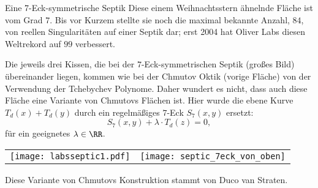 \begin{surferPage}[7-Eck]{Eine 7-Eck-symmetrische Septik}
  Diese einem Weihnachtsstern ähnelnde Fläche ist vom Grad $7$.  
    Bis vor Kurzem stellte sie noch die maximal bekannte Anzahl, $84$, von reellen
    Singularitäten auf einer Septik dar;
    erst 2004 hat Oliver Labs diesen Weltrekord auf $99$ verbessert. 

    Die jeweils drei Kissen, die bei der $7$-Eck-symmetrischen Septik (großes
    Bild) 
    übereinander liegen, kommen wie bei der 
    Chmutov Oktik (vorige Fläche) von der Verwendung der Tchebychev Polynome.
    Daher wundert es nicht, dass auch diese Fläche eine Variante von
    Chmutovs Flächen ist. 
    Hier wurde die ebene Kurve $T_d(x)+T_d(y)$
    durch ein regelmäßiges $7$-Eck $S_7(x,y)$ ersetzt:
    \[S_7(x,y) + \lambda \cdot T_d(z) = 0,\]
    für ein geeignetes $\lambda\in\RR$. 
    \vspace*{-0.3em}
    \begin{center}
      \begin{tabular}{c@{\qquad}c}
        \texttt{[image: labsseptic1.pdf]}
        &
        \texttt{[image: septic\_7eck\_von\_oben]}
      \end{tabular}
    \end{center}
    \vspace*{-0.3em}    
   Diese Variante von Chmutovs Konstruktion stammt von Duco van
    Straten. 
\end{surferPage}

